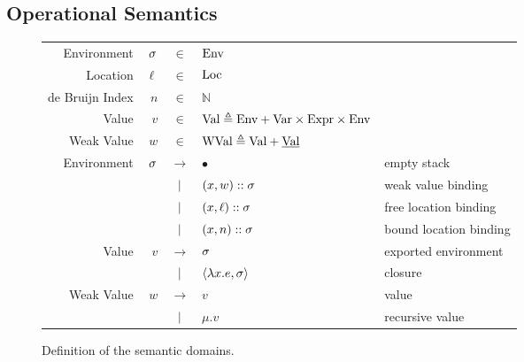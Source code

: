 \documentclass{article}
\begin{document}
\subsection{Operational Semantics}
\begin{figure}[h!]
	\centering
	\small
	\begin{tabular}{rrcll}
		Environment     & $\sigma$ & $\in$         & $\text{Env}$                                                                         \\
		Location        & $\ell$ & $\in$         & $\text{Loc}$                                                                         \\
		de Bruijn Index & $n$    & $\in$         & $\mathbb{N}$                                                                   \\
		Value           & $v$    & $\in$         & $\text{Val} \triangleq\text{Env}+\text{Var}\times\text{Expr}\times\text{Env}$                          \\
		Weak Value      & $w$    & $\in$         & $\text{WVal}\triangleq\text{Val}+\underline{\text{Val}}$                                      \\
		Environment     & $\sigma$ & $\rightarrow$ & $\bullet$                                             & empty stack            \\
		                &        & $|$       & $(x,w):: \sigma$                                     & weak value binding     \\
		                &        & $|$       & $(x,\ell)::\sigma$                                   & free location binding  \\
		                &        & $|$       & $(x,n)::\sigma$                                      & bound location binding \\
		Value           & $v$    & $\rightarrow$ & $\sigma$                                                & exported environment   \\
		                &        & $|$       & $\langle \lambda x.e, \sigma \rangle$                   & closure                \\
		Weak Value      & $w$    & $\rightarrow$ & $v$                                                   & value                  \\
		                &        & $|$       & $\mu.v$                                               & recursive value
	\end{tabular}
	\caption{Definition of the semantic domains.}
	\label{fig:domain}
\end{figure}
\end{document}
